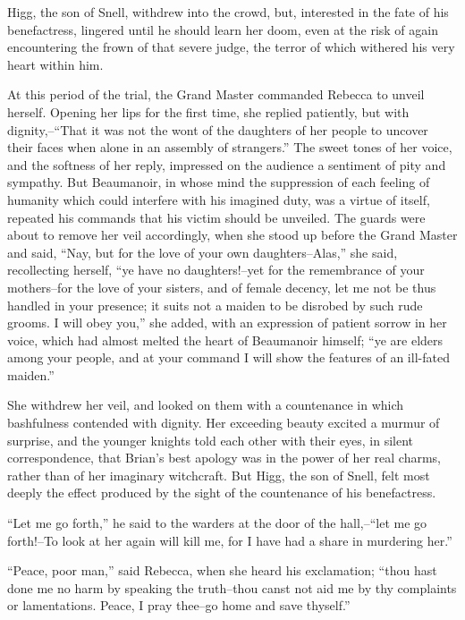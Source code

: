 Higg, the son of Snell, withdrew into the crowd, but, interested in the
fate of his benefactress, lingered until he should learn her doom, even
at the risk of again encountering the frown of that severe judge, the
terror of which withered his very heart within him.

At this period of the trial, the Grand Master commanded Rebecca to
unveil herself. Opening her lips for the first time, she replied
patiently, but with dignity,--``That it was not the wont of the
daughters of her people to uncover their faces when alone in an assembly
of strangers.'' The sweet tones of her voice, and the softness of her
reply, impressed on the audience a sentiment of pity and sympathy. But
Beaumanoir, in whose mind the suppression of each feeling of humanity
which could interfere with his imagined duty, was a virtue of itself,
repeated his commands that his victim should be unveiled. The guards
were about to remove her veil accordingly, when she stood up before the
Grand Master and said, ``Nay, but for the love of your own
daughters--Alas,'' she said, recollecting herself, ``ye have no
daughters!--yet for the remembrance of your mothers--for the love of
your sisters, and of female decency, let me not be thus handled in your
presence; it suits not a maiden to be disrobed by such rude grooms. I
will obey you,'' she added, with an expression of patient sorrow in her
voice, which had almost melted the heart of Beaumanoir himself; ``ye are
elders among your people, and at your command I will show the features
of an ill-fated maiden.''

She withdrew her veil, and looked on them with a countenance in which
bashfulness contended with dignity. Her exceeding beauty excited a
murmur of surprise, and the younger knights told each other with their
eyes, in silent correspondence, that Brian's best apology was in the
power of her real charms, rather than of her imaginary witchcraft. But
Higg, the son of Snell, felt most deeply the effect produced by the
sight of the countenance of his benefactress.

``Let me go forth,'' he said to the warders at the door of the
hall,--``let me go forth!--To look at her again will kill me, for I have
had a share in murdering her.''

``Peace, poor man,'' said Rebecca, when she heard his exclamation;
``thou hast done me no harm by speaking the truth--thou canst not aid me
by thy complaints or lamentations. Peace, I pray thee--go home and save
thyself.''

